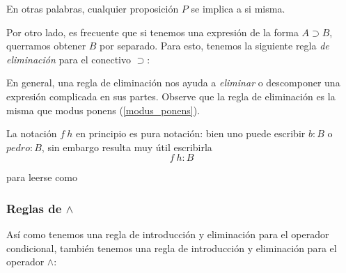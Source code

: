 \documentclass{article}
\begin{document}
\begin{prooftree}
\end{prooftree}

En otras palabras, cualquier proposición $P$ se implica a si misma.

Por otro lado, es frecuente que si tenemos una expresión de la forma $A \supset B$, querramos obtener $B$ por separado. Para esto, tenemos la siguiente regla \textit{de eliminación} para el conectivo $\supset$:


\begin{definition}
    \hfill\newline
    \begin{prooftree}
    \end{prooftree}
\end{definition}

En general, una regla de eliminación nos ayuda a \textit{eliminar} o descomponer una expresión complicada en sus partes. Observe que la regla de eliminación es la misma que modus ponens (\ref{modus_ponens}).

La notación $f\ h$ en principio es pura notación: bien uno puede escribir $b : B$ o $pedro : B$, sin embargo resulta muy útil escribirla
$$
    f\ h : B
$$

para leerse como

\begin{center}
\end{center}

\subsubsection{Reglas de $\wedge$}

Así como tenemos una regla de introducción y eliminación para el operador condicional, también tenemos una regla de introducción y eliminación para el operador $\wedge$:
\end{document}
